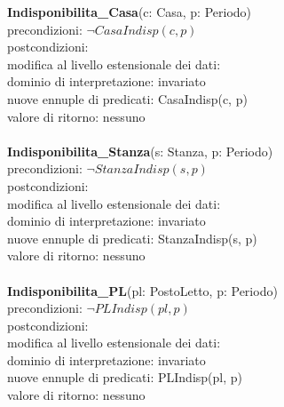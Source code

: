 \documentclass[a4paper,12pt]{report}
\begin{document}
        \newpage

        \hspace*{-1cm}
        \textbf{Indisponibilita\_Casa}(c: Casa, p: Periodo) \\
        \hspace*{1cm} precondizioni: $\neg CasaIndisp(c, p)$ \\
        \hspace*{1cm} postcondizioni: \\
        \hspace*{2cm} modifica al livello estensionale dei dati: \\
        \hspace*{3cm} dominio di interpretazione: invariato \\
        \hspace*{3cm} nuove ennuple di predicati: CasaIndisp(c, p) \\
        \hspace*{2cm} valore di ritorno: nessuno \\ \\

        \hspace*{-1cm}
        \textbf{Indisponibilita\_Stanza}(s: Stanza, p: Periodo) \\
        \hspace*{1cm} precondizioni: $\neg StanzaIndisp(s, p)$ \\
        \hspace*{1cm} postcondizioni: \\
        \hspace*{2cm} modifica al livello estensionale dei dati: \\
        \hspace*{3cm} dominio di interpretazione: invariato \\
        \hspace*{3cm} nuove ennuple di predicati: StanzaIndisp(s, p) \\
        \hspace*{2cm} valore di ritorno: nessuno \\ \\

        \hspace*{-1cm}
        \textbf{Indisponibilita\_PL}(pl: PostoLetto, p: Periodo) \\
        \hspace*{1cm} precondizioni: $\neg PLIndisp(pl, p)$ \\
        \hspace*{1cm} postcondizioni: \\
        \hspace*{2cm} modifica al livello estensionale dei dati: \\
        \hspace*{3cm} dominio di interpretazione: invariato \\
        \hspace*{3cm} nuove ennuple di predicati: PLIndisp(pl, p) \\
        \hspace*{2cm} valore di ritorno: nessuno \\ \\
\end{document}
